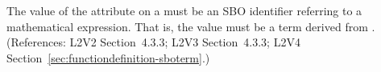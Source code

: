 The value of the  attribute on a \FunctionDefinition must be an
SBO identifier referring to a mathematical expression.  That is, the value
must be a term derived from \sbomathformula.  (References: L2V2 Section~4.3.3;
L2V3 Section~4.3.3; L2V4 Section~\ref{sec:functiondefinition-sboterm}.)
